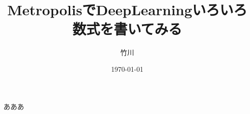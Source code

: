 \documentclass{beamer}
\title{MetropolisでDeepLearningいろいろ数式を書いてみる}
\author{竹川}
\date{\today}
\begin{document}
\maketitle

あああ
\end{document}
